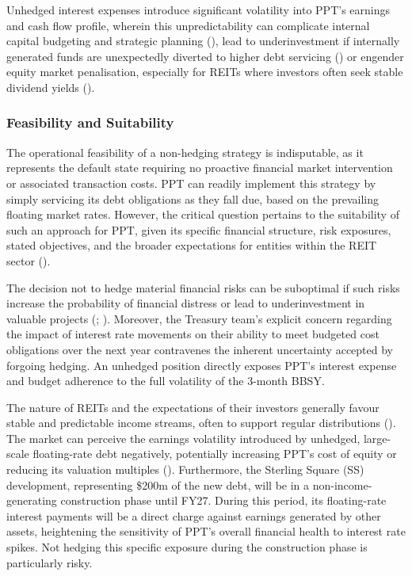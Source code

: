 \documentclass[11pt, a4paper, british]{article}
\begin{document}
Unhedged interest expenses introduce significant volatility into PPT's earnings and cash flow profile, wherein this unpredictability can complicate internal capital budgeting and strategic planning (\cite{fss}), lead to underinvestment if internally generated funds are unexpectedly diverted to higher debt servicing (\cite{ms}) or engender equity market penalisation, especially for REITs where investors often seek stable dividend yields (\cite{ons}).


\subsubsection{Feasibility and Suitability}
The operational feasibility of a non-hedging strategy is indisputable, as it represents the default state requiring no proactive financial market intervention or associated transaction costs. PPT can readily implement this strategy by simply servicing its debt obligations as they fall due, based on the prevailing floating market rates. However, the critical question pertains to the suitability of such an approach for PPT, given its specific financial structure, risk exposures, stated objectives, and the broader expectations for entities within the REIT sector (\cite{mw}).

The decision not to hedge material financial risks can be suboptimal if such risks increase the probability of financial distress or lead to underinvestment in valuable projects (\cite{fss}; \cite{ss}). Moreover, the Treasury team's explicit concern regarding the impact of interest rate movements on their ability to meet budgeted cost obligations over the next year contravenes the inherent uncertainty accepted by forgoing hedging. An unhedged position directly exposes PPT's interest expense and budget adherence to the full volatility of the 3-month BBSY.

The nature of REITs and the expectations of their investors generally favour stable and predictable income streams, often to support regular distributions (\cite{g}). The market can perceive the earnings volatility introduced by unhedged, large-scale floating-rate debt negatively, potentially increasing PPT's cost of equity or reducing its valuation multiples (\cite{aw}). Furthermore, the Sterling Square (SS) development, representing \$200m of the new debt, will be in a non-income-generating construction phase until FY27. During this period, its floating-rate interest payments will be a direct charge against earnings generated by other assets, heightening the sensitivity of PPT's overall financial health to interest rate spikes. Not hedging this specific exposure during the construction phase is particularly risky.
\end{document}
